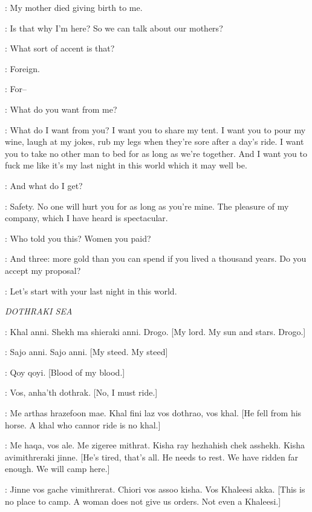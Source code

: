 \TYRION: My mother died giving birth to me. 

\SHAE: Is that why I'm here? So we can talk about our mothers? 

\TYRION: What sort of accent is that? 

\SHAE: Foreign. 

\TYRION: For--

\SHAE: What do you want from me? 

\TYRION: What do I want from you? I want you to share my tent. I want you to pour my wine, laugh at my jokes, rub my legs when they're sore after a day's ride. I want you to take no other man to bed for as long as we're together. And I want you to fuck me like it's my last night in this world which it may well be. 

\SHAE: And what do I get? 

\TYRION: Safety. No one will hurt you for as long as you're mine. The pleasure of my company, which I have heard is spectacular. 

\SHAE: Who told you this? Women you paid? 

\TYRION: And three: more gold than you can spend if you lived a thousand years. Do you accept my proposal? 

\SHAE: Let's start with your last night in this world. 


\scene

\textit{DOTHRAKI SEA} 


\DAENERYS: Khal anni. Shekh ma shieraki anni. Drogo. [My lord. My sun and stars. Drogo.] 


\DROGO: Sajo anni. Sajo anni. [My steed. My steed] 

\HAGGO: Qoy qoyi. [Blood of my blood.] 

\DROGO: Vos, anha'th dothrak. [No, I must ride.] 

\QOTHO: Me arthas hrazefoon mae. Khal fini laz vos dothrao, vos khal.  [He fell from his horse. A khal who cannor ride is no khal.] 

\DAENERYS: Me haqa, vos ale. Me zigeree mithrat. Kisha ray hezhahish chek asshekh. Kisha avimithreraki jinne. [He's tired, that's all. He needs to rest. We have ridden far enough. We will camp here.] 

\QOTHO: Jinne vos gache vimithrerat. Chiori vos assoo kisha. Vos Khaleesi akka. [This is no place to camp. A woman does not give us orders. Not even a Khaleesi.] 

